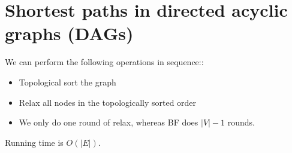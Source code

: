 \documentclass[12pt]{book}
\begin{document}
\section*{Shortest paths in directed acyclic graphs (DAGs)}

We can perform the following operations in sequence::

\begin{itemize}
    \item Topological sort the graph
    \item Relax all nodes in the topologically sorted order
    \item We only do one round of relax, whereas BF does $|V|-1$ rounds.
\end{itemize}

Running time is $O(|E|)$.
\end{document}
